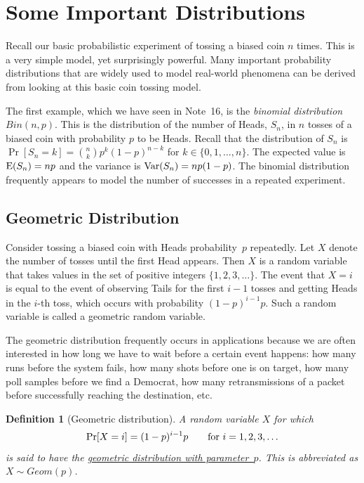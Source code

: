 \documentclass[11pt]{article}
\def\ul#1{\underline{#1}}
\def\Ex#1{{\rm E}(#1)}
\def\Var#1{{\rm Var}(#1)}
\newcounter{thm}
\newtheorem{definition}{Definition}[thm]
\begin{document}
\maketitle

\section*{Some Important Distributions}

Recall our basic probabilistic experiment of tossing a biased coin $n$ times. This is a very simple
model, yet surprisingly powerful. Many important probability distributions that are
widely used to model real-world phenomena can be derived from looking at this basic coin
tossing model.

The first example, which we have seen in Note~16, is the {\em binomial distribution} $Bin(n,p)$.
This is the distribution of the number of Heads, $S_n$, in $n$ tosses of a biased coin with probability $p$ to be Heads. 
Recall that the distribution of $S_n$ is $\Pr[S_n = k] = {n \choose k} p^k (1-p)^{n-k}$ for $k \in \{0,1,\dots,n\}$. The expected value is $\Ex{S_n} = np$ and the variance is $\Var{S_n} = np(1-p)$. The binomial distribution frequently appears
to model the number of successes in a repeated experiment.


\subsection*{Geometric Distribution}

Consider tossing a biased coin with Heads probability~$p$ repeatedly. Let $X$ denote
the number of tosses until the first Head appears. Then $X$ is a random variable that 
takes values in the set of positive integers $\{1,2,3,\dots\}$. The event that
$X = i$ is equal to the event of observing Tails for the first $i-1$ tosses and getting Heads
in the $i$-th toss, which occurs with probability $(1-p)^{i-1}p$. Such a random variable is
called a geometric random variable.

The geometric distribution frequently occurs in applications because
we are often interested in how long we have to wait before a
certain event happens: how many runs before the system fails, how many
shots before one is on target, how many poll samples before we find
a Democrat, how many retransmissions of a packet before successfully
reaching the destination, etc.



\begin{definition}[Geometric distribution] A random variable $X$ for which $$
   \Pr[X=i] = (1-p)^{i-1}p\qquad\hbox{\rm for $i=1,2,3,\ldots$}  $$
is said to have the \ul{geometric distribution with parameter~$p$}. This is abbreviated as $X \sim Geom(p)$.
\end{definition}
\end{document}
